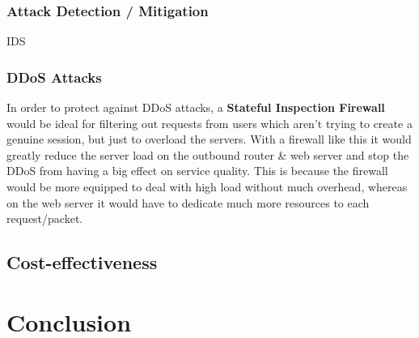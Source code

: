 \documentclass[11pt]{article}
\begin{document}
        \subsubsection{Attack Detection / Mitigation}
          IDS

        \subsubsection{DDoS Attacks}
          In order to protect against DDoS attacks, a \textbf{Stateful Inspection Firewall} would be ideal for filtering out requests from users which aren't trying to create a genuine session, but just to overload the servers. With a firewall like this it would greatly reduce the server load on the outbound router \& web server and stop the DDoS from having a big effect on service quality. This is because the firewall would be more equipped to deal with high load without much overhead, whereas on the web server it would have to dedicate much more resources to each request/packet.

      \subsection{Cost-effectiveness}

    \section{Conclusion}

  \newpage

  
  
\end{document}

